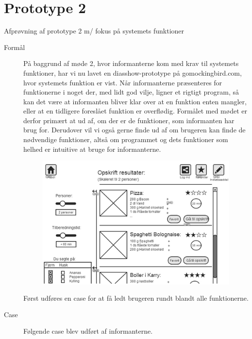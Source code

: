 \section{Prototype 2}

Afprøvning af prototype 2 m/ fokus på systemets funktioner

\begin{description}
\item[Formål] På baggrund af møde 2, hvor informanterne kom med krav til systemets funktioner, har vi nu lavet en diasshow-prototype på gomockingbird.com, hvor systemets funktion er vist. Når informanterne præsenteres for funktionerne i noget der, med lidt god vilje, ligner et rigtigt program, så kan det være at informanten bliver klar over at en funktion enten mangler, eller at en tidligere foreslået funktion er overflødig. Formålet med mødet er derfor primært at ud af, om der er de funktioner, som informanten har brug for. Derudover vil vi også gerne finde ud af om brugeren kan finde de nødvendige funktioner, altså om programmet og dets funktioner som helhed er intuitive at bruge for informanterne.

\begin{figure}[H]
\centering
\includegraphics[scale=0.7]{billeder/prototyper/prototype2.png}
\label{fig:prototype2}
\end{figure}

Først udføres en case for at få ledt brugeren rundt blandt alle funktionerne.

\item[Case] Følgende case blev udført af informanterne.


\end{description}
